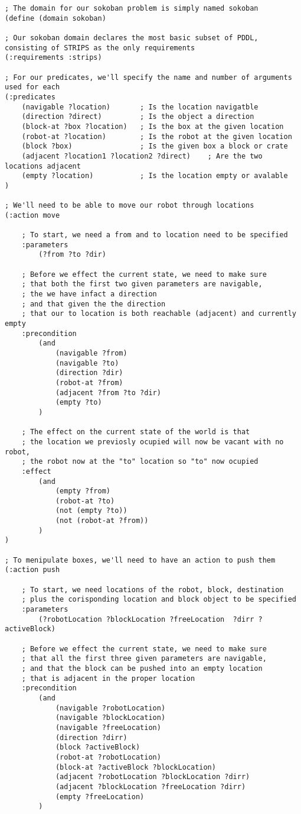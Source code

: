 \documentclass{article}
\begin{document}
    \begin{Verbatim}[commandchars=\\\{\}]
; The domain for our sokoban problem is simply named sokoban
(define (domain sokoban)

; Our sokoban domain declares the most basic subset of PDDL, consisting of STRIPS as the only requirements
(:requirements :strips)

; For our predicates, we'll specify the name and number of arguments used for each
(:predicates
	(navigable ?location)		; Is the location navigatble
	(direction ?direct)			; Is the object a direction
	(block-at ?box ?location)	; Is the box at the given location
	(robot-at ?location)		; Is the robot at the given location
	(block ?box)				; Is the given box a block or crate
	(adjacent ?location1 ?location2 ?direct) 	; Are the two locations adjacent
	(empty ?location)			; Is the location empty or avalable
)

; We'll need to be able to move our robot through locations
(:action move
	
	; To start, we need a from and to location need to be specified
	:parameters
		(?from ?to ?dir)

	; Before we effect the current state, we need to make sure
	; that both the first two given parameters are navigable,
	; the we have infact a direction
	; and that given the the direction
	; that our to location is both reachable (adjacent) and currently empty
	:precondition 
		(and 
			(navigable ?from) 
			(navigable ?to) 
			(direction ?dir) 
			(robot-at ?from) 
			(adjacent ?from ?to ?dir) 
			(empty ?to)
		)

	; The effect on the current state of the world is that
	; the location we previosly ocupied will now be vacant with no robot,
	; the robot now at the "to" location so "to" now ocupied
	:effect 
		(and 
			(empty ?from)
			(robot-at ?to) 
			(not (empty ?to))
			(not (robot-at ?from))
		)
)

; To menipulate boxes, we'll need to have an action to push them
(:action push

	; To start, we need locations of the robot, block, destination
	; plus the corisponding location and block object to be specified
	:parameters
		(?robotLocation ?blockLocation ?freeLocation  ?dirr ?activeBlock)

	; Before we effect the current state, we need to make sure
	; that all the first three given parameters are navigable,
	; and that the block can be pushed into an empty location
	; that is adjacent in the proper location
	:precondition 
		(and 
			(navigable ?robotLocation) 
			(navigable ?blockLocation) 
			(navigable ?freeLocation)          
			(direction ?dirr) 
			(block ?activeBlock) 
			(robot-at ?robotLocation)                   
			(block-at ?activeBlock ?blockLocation) 
			(adjacent ?robotLocation ?blockLocation ?dirr)                   
			(adjacent ?blockLocation ?freeLocation ?dirr) 
			(empty ?freeLocation)
		)


\end{Verbatim}
\end{document}
